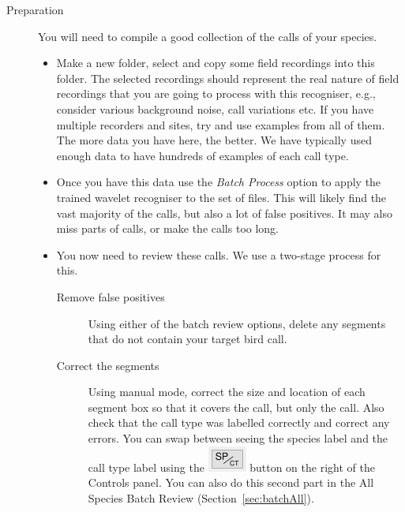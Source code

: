 \documentclass{scrartcl}
\begin{document}
\begin{description}
\item[Preparation] You will need to compile a good collection of the calls of your species. 
\begin{itemize}
\item Make a new folder, select and copy some field recordings into this folder. The selected recordings should represent the real nature of field recordings that you are going to process with this recogniser, e.g., consider various background noise, call variations etc. If you have multiple recorders and sites, try and use examples from all of them. The more data you have here, the better. We have typically used enough data to have hundreds of examples of each call type.
\item Once you have this data use the \textit{Batch Process} option to apply the trained wavelet recogniser to the set of files. This will likely find the vast majority of the calls, but also a lot of false positives. It may also miss parts of calls, or make the calls too long. 
\item You now need to review these calls. We use a two-stage process for this.
    \begin{description} 
    \item[Remove false positives] Using either of the batch review options, delete any segments that do not contain your target bird call. 
    \item[Correct the segments] Using manual mode, correct the size and location of each segment box so that it covers the call, but only the call. Also check that the call type was labelled correctly and correct any errors. You can swap between seeing the species label and the call type label using the \includegraphics[scale=0.5]{Figures/SPCT} button on the right of the Controls panel. You can also do this second part in the All Species Batch Review (Section~\ref{sec:batchAll}).


\end{description}
\end{itemize}
\end{description}
\end{document}
